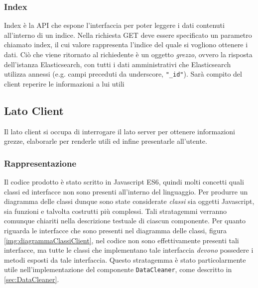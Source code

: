 \subsubsection{Index}
Index è la API che espone l'interfaccia per poter leggere i dati contenuti all'interno di un indice. Nella richiesta GET deve essere specificato un parametro chiamato index, il cui valore rappresenta l'indice del quale si vogliono ottenere i dati. Ciò che viene ritornato al richiedente è un oggetto \emph{grezzo}, ovvero la risposta dell'istanza Elasticsearch, con tutti i dati amministrativi che Elasticsearch utilizza annessi (e.g. campi preceduti da underscore, \texttt{"\_id"}). Sarà compito del client reperire le informazioni a lui utili

\subsection{Lato Client}
Il lato client si occupa di interrogare il lato server per ottenere informazioni grezze, elaborarle per renderle utili ed infine presentarle all'utente.

\label{sec:Componenti}
\subsubsection{Rappresentazione}
Il codice prodotto è stato scritto in Javascript ES6, quindi molti concetti quali classi ed interfacce non sono presenti all'interno del linguaggio. Per produrre un diagramma delle classi dunque sono state considerate \emph{ classi } sia oggetti Javascript, sia funzioni e talvolta costrutti più complessi. Tali stratagemmi verranno comunque chiariti nella descrizione testuale di ciascun componente. Per quanto riguarda le interfacce che sono presenti nel diagramma delle classi, figura \ref{img:diagrammaClassiClient}, nel codice non sono effettivamente presenti tali interfacce, ma tutte le classi che implementano tale interfaccia \emph{devono} possedere i metodi esposti da tale interfaccia. Questo stratagemma è stato particolarmente utile nell'implementazione del componente \texttt{DataCleaner}, come descritto in \ref{sec:DataCleaner}.

